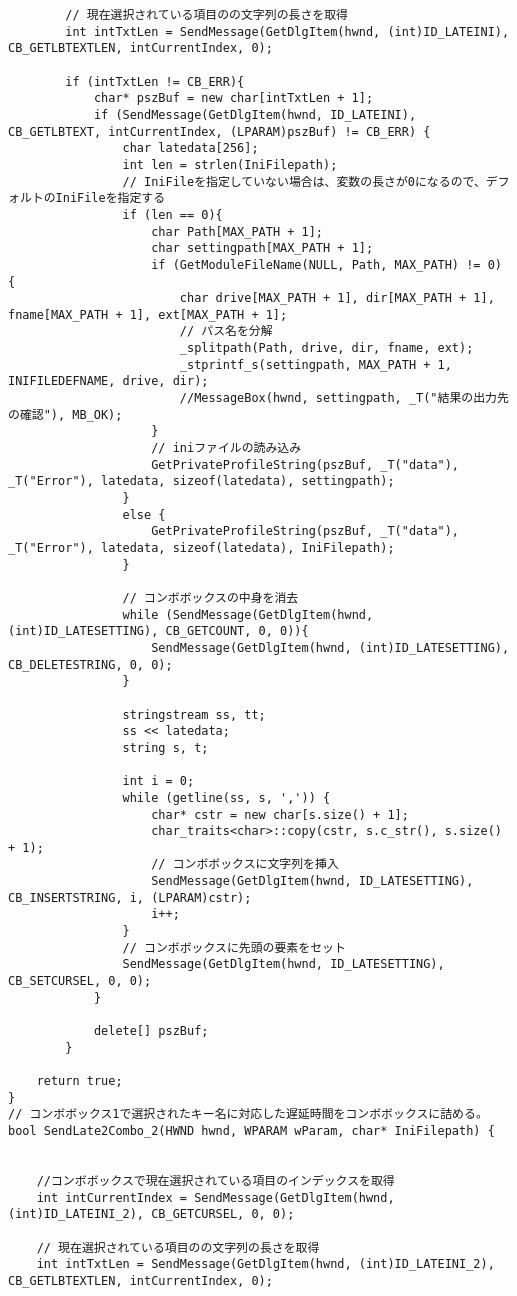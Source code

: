 \begin{verbatim}
		// 現在選択されている項目のの文字列の長さを取得
		int intTxtLen = SendMessage(GetDlgItem(hwnd, (int)ID_LATEINI), CB_GETLBTEXTLEN, intCurrentIndex, 0);

		if (intTxtLen != CB_ERR){
			char* pszBuf = new char[intTxtLen + 1];
			if (SendMessage(GetDlgItem(hwnd, ID_LATEINI), CB_GETLBTEXT, intCurrentIndex, (LPARAM)pszBuf) != CB_ERR) {
				char latedata[256];
				int len = strlen(IniFilepath);
				// IniFileを指定していない場合は、変数の長さが0になるので、デフォルトのIniFileを指定する
				if (len == 0){
					char Path[MAX_PATH + 1];
					char settingpath[MAX_PATH + 1];
					if (GetModuleFileName(NULL, Path, MAX_PATH) != 0) {
						char drive[MAX_PATH + 1], dir[MAX_PATH + 1], fname[MAX_PATH + 1], ext[MAX_PATH + 1];
						// パス名を分解
						_splitpath(Path, drive, dir, fname, ext);
						_stprintf_s(settingpath, MAX_PATH + 1, INIFILEDEFNAME, drive, dir);
						//MessageBox(hwnd, settingpath, _T("結果の出力先の確認"), MB_OK);
					}
					// iniファイルの読み込み
					GetPrivateProfileString(pszBuf, _T("data"), _T("Error"), latedata, sizeof(latedata), settingpath);
				}
				else {
					GetPrivateProfileString(pszBuf, _T("data"), _T("Error"), latedata, sizeof(latedata), IniFilepath);
				}

				// コンボボックスの中身を消去
				while (SendMessage(GetDlgItem(hwnd, (int)ID_LATESETTING), CB_GETCOUNT, 0, 0)){
					SendMessage(GetDlgItem(hwnd, (int)ID_LATESETTING), CB_DELETESTRING, 0, 0);
				}

				stringstream ss, tt;
				ss << latedata;
				string s, t;

				int i = 0;
				while (getline(ss, s, ',')) {
					char* cstr = new char[s.size() + 1];
					char_traits<char>::copy(cstr, s.c_str(), s.size() + 1);
					// コンボボックスに文字列を挿入
					SendMessage(GetDlgItem(hwnd, ID_LATESETTING), CB_INSERTSTRING, i, (LPARAM)cstr);
					i++;
				}
				// コンボボックスに先頭の要素をセット
				SendMessage(GetDlgItem(hwnd, ID_LATESETTING), CB_SETCURSEL, 0, 0);
			}
			
			delete[] pszBuf;
		}
	
	return true;
}
// コンボボックス1で選択されたキー名に対応した遅延時間をコンボボックスに詰める。
bool SendLate2Combo_2(HWND hwnd, WPARAM wParam, char* IniFilepath) {


	//コンボボックスで現在選択されている項目のインデックスを取得
	int intCurrentIndex = SendMessage(GetDlgItem(hwnd, (int)ID_LATEINI_2), CB_GETCURSEL, 0, 0);

	// 現在選択されている項目のの文字列の長さを取得
	int intTxtLen = SendMessage(GetDlgItem(hwnd, (int)ID_LATEINI_2), CB_GETLBTEXTLEN, intCurrentIndex, 0);


\end{verbatim}
